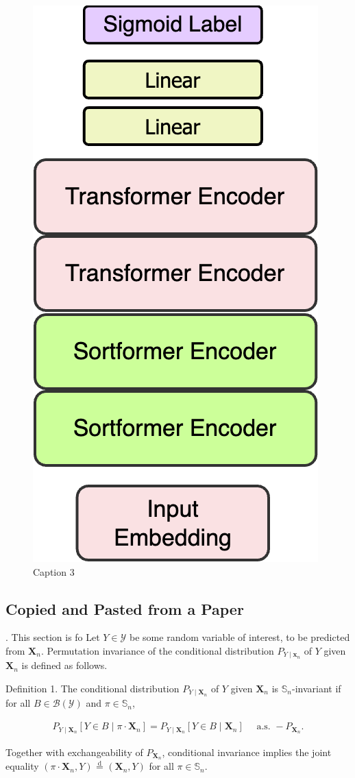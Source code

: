 \documentclass{article}
\begin{document}
\begin{figure}[ht]
\begin{minipage}[b]{0.33\textwidth}
\includegraphics[width=0.5\linewidth]{pics/SortFormer_example.drawio.png}
\caption{Caption 3}
\label{fig:subim3}
\end{minipage}
\end{figure}


\subsection{Copied and Pasted from a Paper}
\cite{bloem2018neural}. This section is fo
Let $Y \in \mathcal{Y}$ be some random variable of interest, to be predicted from $\mathbf{X}_n$. Permutation invariance of the conditional distribution $P_{Y \mid \mathbf{x}_n}$ of $Y$ given $\mathbf{X}_n$ is defined as follows.

Definition 1. The conditional distribution $P_{Y \mid \mathbf{X}_n}$ of $Y$ given $\mathbf{X}_n$ is $\mathbb{S}_n$-invariant if for all $B \in \mathcal{B}(\mathcal{Y})$ and $\pi \in \mathbb{S}_n$,

\begin{align}
P_{Y \mid \mathbf{X}_n}\left[Y \in B \mid \pi \cdot \mathbf{X}_n\right]=P_{Y \mid \mathbf{X}_n}\left[Y \in B \mid \mathbf{X}_n\right] \quad \text { a.s. }-P_{\mathbf{X}_n} .
\end{align}

Together with exchangeability of $P_{\mathbf{X}_n}$, conditional invariance implies the joint equality $\left(\pi \cdot \mathbf{X}_n, Y\right) \stackrel{\text { d }}{=}\left(\mathbf{X}_n, Y\right)$ for all $\pi \in \mathbb{S}_n$.
\end{document}
